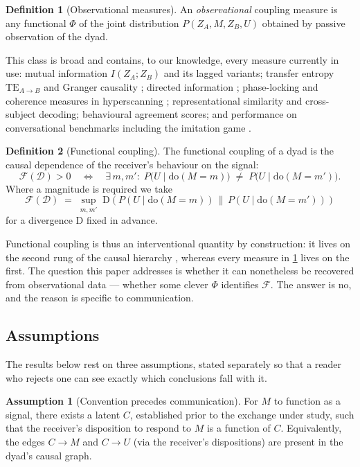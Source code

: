 \documentclass[11pt,a4paper]{article}
\theoremstyle{plain}
\theoremstyle{definition}
\newtheorem{definition}[definition]{Definition}
\newtheorem{assumption}{Assumption}
\theoremstyle{remark}
\newcommand{\Fc}{\mathcal{F}}
\newcommand{\Dy}{\mathcal{D}}
\newcommand{\dop}{\mathrm{do}}
\newcommand{\TE}{\mathrm{TE}}
\begin{document}
\begin{definition}[Observational measures]\label{def:obs}
An \emph{observational} coupling measure is any functional $\Phi$ of the joint distribution
$P(Z_A, M, Z_B, U)$ obtained by passive observation of the dyad.
\end{definition}

This class is broad and contains, to our knowledge, every measure currently in use: mutual
information $I(Z_A;Z_B)$ and its lagged variants; transfer entropy $\TE_{A\to B}$
\citep{schreiber2000measuring} and Granger causality \citep{granger1969investigating};
directed information \citep{permuter2009directed}; phase-locking and coherence measures in
hyperscanning \citep{montague2002hyperscanning, hasson2010brain}; representational
similarity and cross-subject decoding; behavioural agreement scores; and performance on
conversational benchmarks including the imitation game \citep{turing1950computing}.

\begin{definition}[Functional coupling]\label{def:fc}
The functional coupling of a dyad is the causal dependence of the receiver's behaviour on
the signal:
\[
\Fc(\Dy) > 0 \quad\Longleftrightarrow\quad
\exists\, m, m' : \; P\big(U \mid \dop(M{=}m)\big) \;\neq\; P\big(U \mid \dop(M{=}m')\big).
\]
Where a magnitude is required we take
\[
\Fc(\Dy) \;=\; \sup_{m,m'} \; \mathrm{D}\!\left(P(U \mid \dop(M{=}m)) \,\big\|\, P(U \mid \dop(M{=}m'))\right)
\]
for a divergence $\mathrm{D}$ fixed in advance.
\end{definition}

Functional coupling is thus an interventional quantity by construction: it lives on the
second rung of the causal hierarchy \citep{pearl2009causality}, whereas every measure in
\cref{def:obs} lives on the first. The question this paper addresses is whether it can
nonetheless be recovered from observational data --- whether some clever $\Phi$ identifies
$\Fc$. The answer is no, and the reason is specific to communication.

\subsection{Assumptions}\label{sec:assumptions}

The results below rest on three assumptions, stated separately so that a reader who rejects
one can see exactly which conclusions fall with it.

\begin{assumption}[Convention precedes communication]\label{as:convention}
For $M$ to function as a signal, there exists a latent $C$, established prior to the
exchange under study, such that the receiver's disposition to respond to $M$ is a function of
$C$. Equivalently, the edges $C \to M$ and $C \to U$ (via the receiver's dispositions) are
present in the dyad's causal graph.
\end{assumption}
\end{document}
